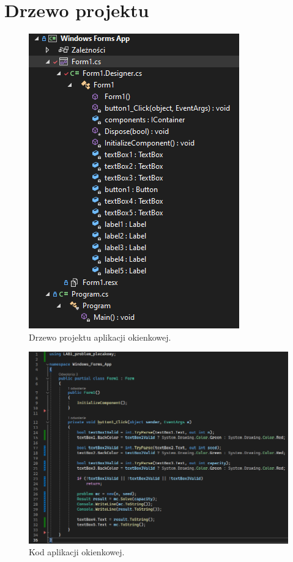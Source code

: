 \documentclass{report}
\begin{document}
\section{Drzewo projektu}

\begin{figure}[H]%
	\centering
	\includegraphics[scale=0.6]{zdj/form_drzewo}
	\caption{Drzewo projektu aplikacji okienkowej.}
\end{figure}


\begin{figure}[H]%
	\centering
	\includegraphics[scale=0.6]{zdj/form_code}
	\caption{Kod aplikacji okienkowej.}
\end{figure}
\end{document}
